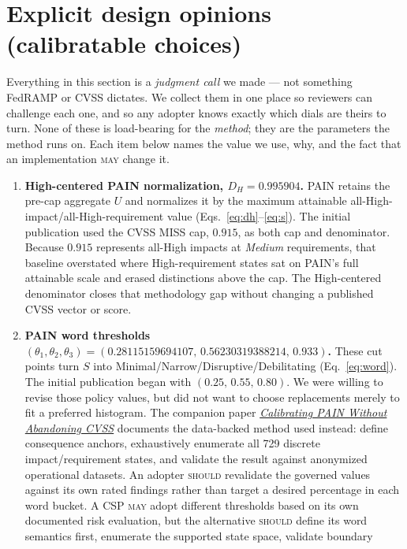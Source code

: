 \documentclass[11pt]{article}
\newcommand{\rfckw}[1]{\textsc{#1}}
\begin{document}
\section{Explicit design opinions (calibratable choices)}
\label{app:opinions}
Everything in this section is a \emph{judgment call} we made --- not something
FedRAMP or CVSS dictates. We collect them in one place so reviewers can challenge
each one, and so any adopter knows exactly which dials are theirs to turn. None of
these is load-bearing for the \emph{method}; they are the parameters the method runs
on. Each item below names the value we use, why, and the fact that an implementation
\rfckw{may} change it.

\begin{enumerate}[leftmargin=1.7em]
\item \textbf{High-centered PAIN normalization, $D_H=0.995904$.}
  PAIN retains the pre-cap aggregate $U$ and normalizes it by the maximum attainable
  all-High-impact/all-High-requirement value (Eqs.~\ref{eq:dh}--\ref{eq:s}). The
  initial publication used the CVSS MISS cap, $0.915$, as both cap and denominator.
  Because $0.915$ represents all-High impacts at \emph{Medium} requirements, that
  baseline overstated where High-requirement states sat on PAIN's full attainable
  scale and erased distinctions above the cap. The High-centered denominator closes
  that methodology gap without changing a published CVSS vector or score.
\item \textbf{PAIN word thresholds $(\theta_1,\theta_2,\theta_3) =
  (0.28115159694107,\,0.56230319388214,\,0.933)$.}
  These cut points turn $S$ into Minimal/Narrow/Disruptive/Debilitating
  (Eq.~\ref{eq:word}). The initial publication began with
  $(0.25,\,0.55,\,0.80)$. We were willing to revise those policy values, but did not
  want to choose replacements merely to fit a preferred histogram. The companion
  paper \href{https://stackarmor.github.io/rfc-fedramp-vdr/vdr-pain-calibration.pdf}
  {\emph{Calibrating PAIN Without Abandoning CVSS}} documents the data-backed
  method used instead: define consequence anchors, exhaustively enumerate all 729
  discrete impact/requirement states, and validate the result against anonymized
  operational datasets. An adopter \rfckw{should} revalidate the governed values
  against its own rated findings rather than target a desired percentage in each
  word bucket. A CSP \rfckw{may} adopt different thresholds based on its own
  documented risk evaluation, but the alternative \rfckw{should} define its word
  semantics first, enumerate the supported state space, validate boundary

\end{enumerate}
\end{document}
